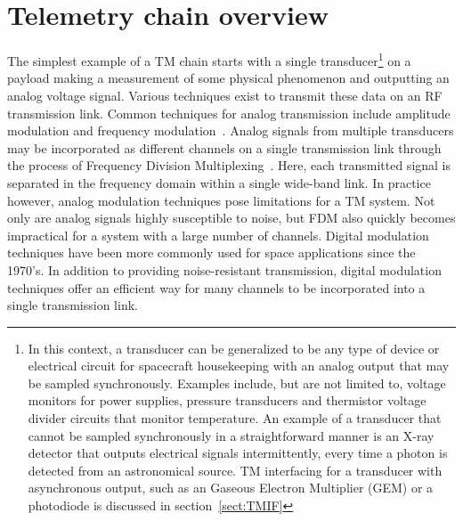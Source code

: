 \documentclass{ws-jai}
\begin{document}
\section{Telemetry chain overview}
\label{sect:TM_chain}
The simplest example of a TM chain starts with a single transducer\footnote{In this context, a transducer can be generalized to be any type of device or electrical circuit for spacecraft housekeeping with an analog output that may be sampled synchronously. Examples include, but are not limited to, voltage monitors for power supplies, pressure transducers and thermistor voltage divider circuits that monitor temperature. An example of a transducer that cannot be sampled synchronously in a straightforward manner is an X-ray detector that outputs electrical signals intermittently, every time a photon is detected from an astronomical source. TM interfacing for a transducer with asynchronous output, such as an Gaseous Electron Multiplier (GEM) or a photodiode is discussed in section~\ref{sect:TMIF}} 
on a payload making a measurement of some physical phenomenon and outputting an analog voltage signal. Various techniques exist to transmit these data on an RF transmission link. Common techniques for analog transmission include amplitude modulation and frequency modulation~\cite{Horowitz89}. Analog signals from multiple transducers may be incorporated as different channels on a single transmission link through the process of Frequency Division Multiplexing~\cite[FDM;][]{Plonus01}. Here, each transmitted signal is separated in the frequency domain within a single wide-band link. In practice however, analog modulation techniques pose limitations for a TM system. Not only are analog signals highly susceptible to noise, but FDM also quickly becomes impractical for a system with a large number of channels. Digital modulation techniques have been more commonly used for space applications since the 1970's. In addition to providing noise-resistant transmission, digital modulation techniques offer an efficient way for many channels to be incorporated into a single transmission link.
\end{document}
